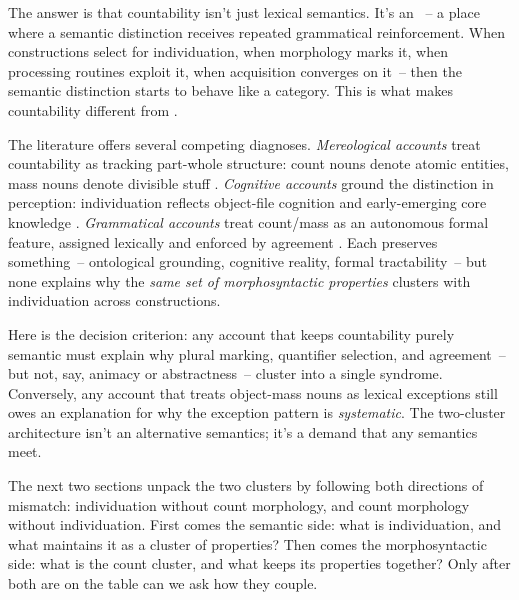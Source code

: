 The answer is that countability isn't just lexical semantics. It's an ~-- a place where a semantic distinction receives repeated grammatical reinforcement. When constructions select for individuation, when morphology marks it, when processing routines exploit it, when acquisition converges on it~-- then the semantic distinction starts to behave like a category. This is what makes countability different from .

The literature offers several competing diagnoses. \emph{Mereological accounts} treat countability as tracking part-whole structure: count nouns denote atomic entities, mass nouns denote divisible stuff \citep{link1983,chierchia1998}. \emph{Cognitive accounts} ground the distinction in perception: individuation reflects object-file cognition and early-emerging core knowledge \citep{spelke2007,bloom1994a}. \emph{Grammatical accounts} treat count/mass as an autonomous formal feature, assigned lexically and enforced by agreement \citep{borer2005}. Each preserves something~-- ontological grounding, cognitive reality, formal tractability~-- but none explains why the \emph{same set of morphosyntactic properties} clusters with individuation across constructions.

Here is the decision criterion: any account that keeps countability purely semantic must explain why plural marking, quantifier selection, and agreement~-- but not, say, animacy or abstractness~-- cluster into a single syndrome. Conversely, any account that treats object-mass nouns as lexical exceptions still owes an explanation for why the exception pattern is \emph{systematic}. The two-cluster architecture isn't an alternative semantics; it's a demand that any semantics meet.

The next two sections unpack the two clusters by following both directions of mismatch: individuation without count morphology, and count morphology without individuation. First comes the semantic side: what is individuation, and what maintains it as a cluster of properties? Then comes the morphosyntactic side: what is the count cluster, and what keeps its properties together? Only after both are on the table can we ask how they couple.

